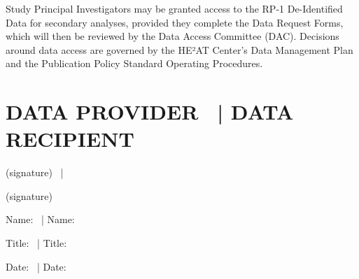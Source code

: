 \documentclass[12pt,letterpaper]{article}
\begin{document}
Study Principal Investigators may be granted access to the RP-1 De-Identified Data for secondary analyses, provided they complete the Data Request Forms, which will then be reviewed by the Data Access Committee (DAC). Decisions around data access are governed by the HE²AT Center’s Data Management Plan and the Publication Policy Standard Operating Procedures.

\section*{DATA PROVIDER  | DATA RECIPIENT}

(signature)  |   

(signature)

Name:  | Name:

Title:  | Title:

Date:  | Date:
\end{document}
